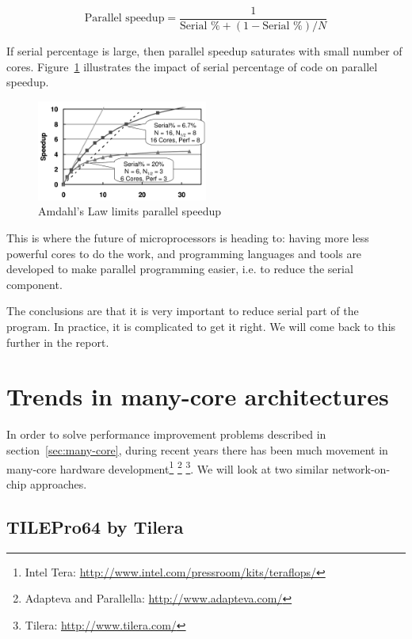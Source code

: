 \documentclass[english,11pt]{l4proj}
\begin{document}
$$
\text{Parallel speedup} =
\frac{1}{\text{Serial \%} + (1 - \text{Serial \%}) / N}
$$

If serial percentage is large, then parallel speedup saturates with small number
of cores. Figure~\ref{fig:amdahl} illustrates the impact of serial
percentage of code on parallel speedup.

\begin{figure}[h]
    \centering
    \includegraphics[width=0.5\textwidth]{images/amdahl.png}
    \caption{Amdahl's Law limits parallel speedup\cite{future-microprocessors}}
    \label{fig:amdahl}
\end{figure}

This is where the future of microprocessors is heading to: having more less
powerful cores to do the work\cite{future-microprocessors}, and programming
languages and tools are developed to make parallel programming easier, i.e. to
reduce the serial component.

The conclusions are that it is very important to reduce serial part of the
program. In practice, it is complicated to get it right. We will come back to
this further in the report.

\section{Trends in many-core architectures}
\label{sec:manycore-trends}

In order to solve performance improvement problems described in
section~\ref{sec:many-core}, during recent years there has been much movement in
many-core hardware development\footnote{Intel Tera:
\url{http://www.intel.com/pressroom/kits/teraflops/}} \footnote{Adapteva and
Parallella: \url{http://www.adapteva.com/}} \footnote{Tilera:
\url{http://www.tilera.com/}}. We will look at two similar network-on-chip
approaches.

\subsection{TILEPro64 by Tilera}
\label{sec:tilera}
\end{document}
